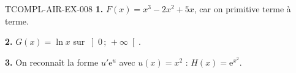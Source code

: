 \begin{corrige}{TCOMPL-AIR-EX-008}
\textbf{1.} $F(x)=x^3-2x^2+5x$, car on primitive terme à terme.

\textbf{2.} $G(x)=\ln x$ sur $\left]0\,;\,+\infty\right[$.

\textbf{3.} On reconnaît la forme $u'\mathrm{e}^{u}$ avec $u(x)=x^2$ :
$H(x)=\mathrm{e}^{x^2}$.
\end{corrige}
